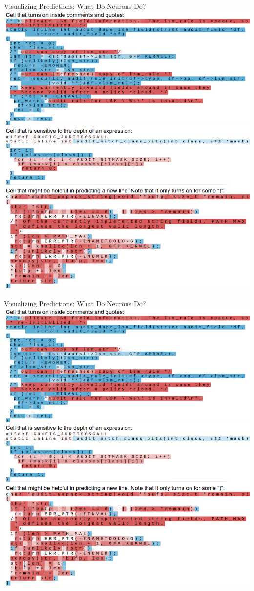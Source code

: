 \documentclass[10pt,xcolor=dvipsnames]{beamer}
\begin{document}
\begin{frame}{Visualizing Predictions: What Do Neurons Do?}
  \includegraphics[width=\linewidth,trim=0 18cm 0 0,clip]{fig/lstm-pred-6.png}
\end{frame}
\begin{frame}{Visualizing Predictions: What Do Neurons Do?}
  \includegraphics[width=\linewidth,trim=0 0 0 12.7cm,clip]{fig/lstm-pred-6.png}
\end{frame}
\end{document}
